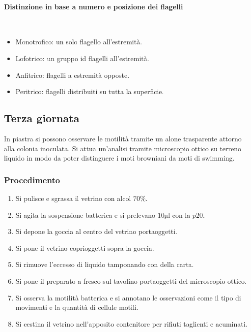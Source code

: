 			\paragraph{Distinzione in base a numero e posizione dei flagelli}\mbox{}\\
			\begin{multicols}{2}
				\begin{itemize}
					\item Monotrofico: un solo flagello all'estremit\`a.
					\item Lofotrico: un gruppo id flagelli all'estremit\`a.
					\item Anfitrico: flagelli a estremit\`a opposte.
					\item Peritrico: flagelli distribuiti su tutta la superficie.
				\end{itemize}
			\end{multicols}

	\subsection{Terza giornata}
	In piastra si possono osservare le motilit\`a tramite un alone trasparente attorno alla colonia inoculata.
	Si attua un'analisi tramite microscopio ottico su terreno liquido in modo da poter distinguere i moti browniani da moti di swimming.

		\subsubsection{Procedimento}
		\begin{enumerate}
			\item Si pulisce e sgrassa il vetrino con alcol $70\%$.
			\item Si agita la sospensione batterica e si prelevano $10\si{\micro\litre}$ con la $p20$.
			\item Si depone la goccia al centro del vetrino portaoggetti.
			\item Si pone il vetrino coprioggetti sopra la goccia.
			\item Si rimuove l'eccesso di liquido tamponando con della carta.
			\item Si pone il preparato a fresco sul tavolino portaoggetti del microscopio ottico.
			\item Si osserva la motilit\`a batterica e si annotano le osservazioni come il tipo di movimenti e la quantit\`a di cellule motili.
			\item Si cestina il vetrino nell'apposito contenitore per rifiuti taglienti e acuminati.
		\end{enumerate}
